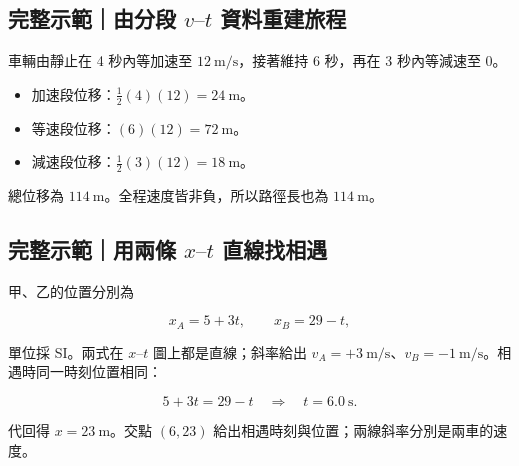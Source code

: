 \documentclass[11pt,a4paper]{article}
\providecommand{\tightlist}{%
  \setlength{\itemsep}{0pt}\setlength{\parskip}{0pt}}
\begin{document}
\begin{HandoutWorkedExample}

\subsection{\texorpdfstring{完整示範｜由分段 \(v\text{–}t\) 資料重建旅程}{完整示範｜由分段 v\textbackslash text\{--\}t 資料重建旅程}}\label{ux5b8cux6574ux793aux7bc4ux7531ux5206ux6bb5-vtextt-ux8cc7ux6599ux91cdux5efaux65c5ux7a0b}

車輛由靜止在 4 秒內等加速至 \(12\ \mathrm{m/s}\)，接著維持 6 秒，再在 3 秒內等減速至 0。

\begin{itemize}
\tightlist
\item
  加速段位移：\(\tfrac12(4)(12)=24\ \mathrm{m}\)。
\item
  等速段位移：\((6)(12)=72\ \mathrm{m}\)。
\item
  減速段位移：\(\tfrac12(3)(12)=18\ \mathrm{m}\)。
\end{itemize}

總位移為 \(114\ \mathrm{m}\)。全程速度皆非負，所以路徑長也為 \(114\ \mathrm{m}\)。

\end{HandoutWorkedExample}

\begin{HandoutWorkedExample}

\subsection{\texorpdfstring{完整示範｜用兩條 \(x\text{–}t\) 直線找相遇}{完整示範｜用兩條 x\textbackslash text\{--\}t 直線找相遇}}\label{ux5b8cux6574ux793aux7bc4ux7528ux5169ux689d-xtextt-ux76f4ux7ddaux627eux76f8ux9047}

甲、乙的位置分別為

\[
x_A=5+3t,\qquad x_B=29-t,
\]

單位採 SI。兩式在 \(x\text{–}t\) 圖上都是直線；斜率給出 \(v_A=+3\ \mathrm{m/s}\)、\(v_B=-1\ \mathrm{m/s}\)。相遇時同一時刻位置相同：

\[
5+3t=29-t\quad\Rightarrow\quad t=6.0\ \mathrm s.
\]

代回得 \(x=23\ \mathrm m\)。交點 \((6,23)\) 給出相遇時刻與位置；兩線斜率分別是兩車的速度。

\end{HandoutWorkedExample}
\end{document}
